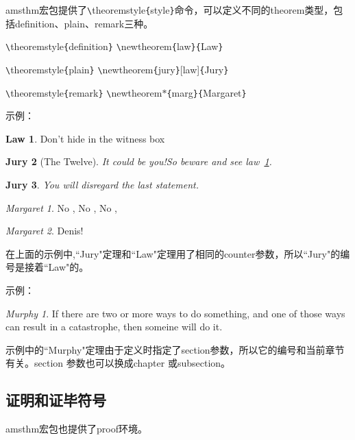 \documentclass[UTF8]{ctexart}
\begin{document}
amsthm宏包提供了\texttt{\textbackslash}theoremstyle\texttt{\{}style\texttt{\}}命令，可以定义不同的theorem类型，包括definition、plain、remark三种。

\texttt{\textbackslash}theoremstyle\texttt{\{}definition\texttt{\}} \quad \texttt{\textbackslash}newtheorem\texttt{\{}law\texttt{\}}\texttt{\{}Law\texttt{\}}

\texttt{\textbackslash}theoremstyle\texttt{\{}plain\texttt{\}}  \qquad \quad \texttt{\textbackslash}newtheorem\texttt{\{}jury\texttt{\}}[law]\texttt{\{}Jury\texttt{\}}

\texttt{\textbackslash}theoremstyle\texttt{\{}remark\texttt{\}} \qquad \texttt{\textbackslash}newtheorem$*$\texttt{\{}marg\texttt{\}}\texttt{\{}Margaret\texttt{\}}

示例：

\theoremstyle{definition}   \newtheorem{law}{Law}
\theoremstyle{plain}        \newtheorem{jury}[law]{Jury}
\theoremstyle{remark}       \newtheorem*{marg}{Margaret}

\begin{law}
   \label{law:box}
   Don't hide in the witness box
\end{law}
\begin{jury}[The Twelve]
   It could be you!So beware and see law~\ref{law:box}.
\end{jury}
\begin{jury}
   You will disregard the last statement.
\end{jury}
\begin{marg}No , No , No , \end{marg}
\begin{marg}Denis! \end{marg}

在上面的示例中,``Jury"定理和``Law"定理用了相同的counter参数，所以``Jury"的编号是接着``Law"的。

示例：

\newtheorem{mur}{Murphy}[section]

\begin{mur}
  If there are two or more ways to do something, and one of those ways can result in a catastrophe,
  then someine will do it.
\end{mur}

示例中的``Murphy"定理由于定义时指定了section参数，所以它的编号和当前章节有关。section
参数也可以换成chapter 或subsection。
\subsection{证明和证毕符号}
amsthm宏包也提供了proof环境。
\end{document}
